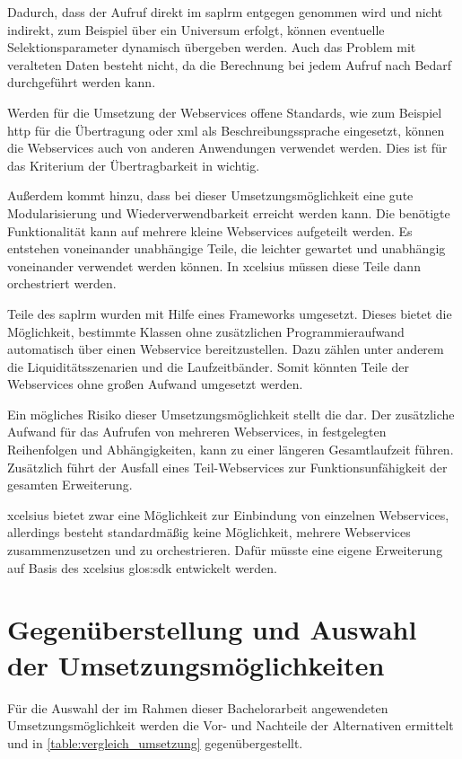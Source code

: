 \begin{onehalfspacing}
Dadurch, dass der Aufruf direkt im \gls{saplrm} entgegen genommen wird und nicht indirekt, zum Beispiel über ein Universum erfolgt, können eventuelle Selektionsparameter dynamisch übergeben werden. Auch das Problem mit veralteten Daten besteht nicht, da die Berechnung bei jedem Aufruf nach Bedarf durchgeführt werden kann.

Werden für die Umsetzung der Webservices offene Standards, wie zum Beispiel \gls{http} für die Übertragung oder \gls{xml} als Beschreibungssprache eingesetzt, können die Webservices auch von anderen Anwendungen verwendet werden. Dies ist für das Kriterium der Übertragbarkeit in  wichtig.

Außerdem kommt hinzu, dass bei dieser Umsetzungsmöglichkeit eine gute Modularisierung und Wiederverwendbarkeit erreicht werden kann. Die benötigte Funktionalität kann auf mehrere kleine Webservices aufgeteilt werden. Es entstehen voneinander unabhängige Teile, die leichter gewartet und unabhängig voneinander verwendet werden können. In \gls{xcelsius} müssen diese Teile dann orchestriert werden.

Teile des \gls{saplrm} wurden mit Hilfe eines Frameworks umgesetzt. Dieses bietet die Möglichkeit, bestimmte Klassen ohne zusätzlichen Programmieraufwand automatisch über einen Webservice bereitzustellen. Dazu zählen unter anderem die Liquiditätsszenarien und die Laufzeitbänder. Somit könnten Teile der Webservices ohne großen Aufwand umgesetzt werden.

Ein mögliches Risiko dieser Umsetzungsmöglichkeit stellt die  dar. Der zusätzliche Aufwand für das Aufrufen von mehreren Webservices, in festgelegten Reihenfolgen und Abhängigkeiten, kann zu einer längeren Gesamtlaufzeit führen. Zusätzlich führt der Ausfall eines Teil-Webservices zur Funktionsunfähigkeit der gesamten Erweiterung.

\gls{xcelsius} bietet zwar eine Möglichkeit zur Einbindung von einzelnen Webservices, allerdings besteht standardmäßig keine Möglichkeit, mehrere Webservices zusammenzusetzen und zu orchestrieren. Dafür müsste eine eigene Erweiterung auf Basis des \gls{xcelsius} \gls{glos:sdk} entwickelt werden.

\section{Gegenüberstellung und Auswahl der Umsetzungsmöglichkeiten}
Für die Auswahl der im Rahmen dieser Bachelorarbeit angewendeten Umsetzungsmöglichkeit werden die Vor- und Nachteile der Alternativen ermittelt und in \vref{table:vergleich_umsetzung} gegenübergestellt.


\end{onehalfspacing}
